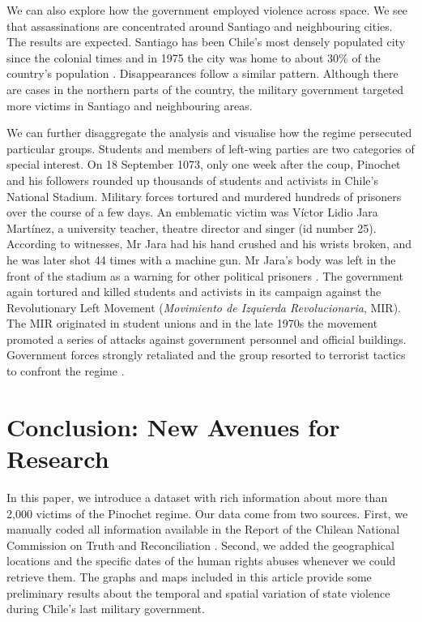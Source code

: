 \documentclass[12pt,a4paper,]{article}
\begin{document}
We can also explore how the government employed violence across space.
We see that assassinations are concentrated around Santiago and
neighbouring cities. The results are expected. Santiago has been Chile's
most densely populated city since the colonial times and in 1975 the
city was home to about 30\% of the country's population
\citep{un1976yearbook}. Disappearances follow a similar pattern.
Although there are cases in the northern parts of the country, the
military government targeted more victims in Santiago and neighbouring
areas.

We can further disaggregate the analysis and visualise how the regime
persecuted particular groups. Students and members of left-wing parties
are two categories of special interest. On 18 September 1073, only one
week after the coup, Pinochet and his followers rounded up thousands of
students and activists in Chile's National Stadium. Military forces
tortured and murdered hundreds of prisoners over the course of a few
days. An emblematic victim was Víctor Lidio Jara Martínez, a university
teacher, theatre director and singer (id number 25). According to
witnesses, Mr Jara had his hand crushed and his wrists broken, and he
was later shot 44 times with a machine gun. Mr Jara's body was left in
the front of the stadium as a warning for other political prisoners
\citep[ 56]{mcsherry2015victor}. The government again tortured and
killed students and activists in its campaign against the Revolutionary
Left Movement (\emph{Movimiento de Izquierda Revolucionaria}, MIR). The
MIR originated in student unions and in the late 1970s the movement
promoted a series of attacks against government personnel and official
buildings. Government forces strongly retaliated and the group resorted
to terrorist tactics to confront the regime
\citep{schlotterbeck2018beyond}.

\hypertarget{conclusion-new-avenues-for-research}{%
\section{Conclusion: New Avenues for
Research}\label{conclusion-new-avenues-for-research}}

In this paper, we introduce a dataset with rich information about more
than 2,000 victims of the Pinochet regime. Our data come from two
sources. First, we manually coded all information available in the
Report of the Chilean National Commission on Truth and Reconciliation
\citeyearpar{report1991}. Second, we added the geographical locations
and the specific dates of the human rights abuses whenever we could
retrieve them. The graphs and maps included in this article provide some
preliminary results about the temporal and spatial variation of state
violence during Chile's last military government.
\end{document}
